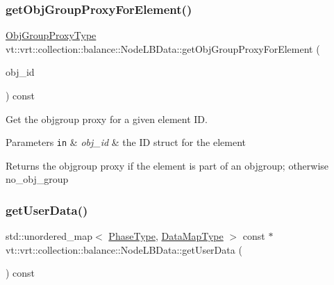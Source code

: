 \subsubsection{\texorpdfstring{get\+Obj\+Group\+Proxy\+For\+Element()}{getObjGroupProxyForElement()}}
{\footnotesize\ttfamily \hyperlink{namespacevt_ad7cae989df485fccca57f0792a880a8e}{Obj\+Group\+Proxy\+Type} vt\+::vrt\+::collection\+::balance\+::\+Node\+L\+B\+Data\+::get\+Obj\+Group\+Proxy\+For\+Element (\begin{DoxyParamCaption}\item[{\hyperlink{namespacevt_1_1vrt_1_1collection_1_1balance_a9f5b53fafb270212279a4757d2c4cd28}{Element\+I\+D\+Struct}}]{obj\+\_\+id }\end{DoxyParamCaption}) const}



Get the objgroup proxy for a given element ID. 


\begin{DoxyParams}[1]{Parameters}
\mbox{\tt in}  & {\em obj\+\_\+id} & the ID struct for the element\\
\hline
\end{DoxyParams}
\begin{DoxyReturn}{Returns}
the objgroup proxy if the element is part of an objgroup; otherwise {\ttfamily no\+\_\+obj\+\_\+group} 
\end{DoxyReturn}
\mbox{\label{structvt_1_1vrt_1_1collection_1_1balance_1_1_node_l_b_data_a73b93e4e239cc32982d5474fca1f7b64}} 
\subsubsection{\texorpdfstring{get\+User\+Data()}{getUserData()}}
{\footnotesize\ttfamily std\+::unordered\+\_\+map$<$ \hyperlink{namespacevt_a46ce6733d5cdbd735d561b7b4029f6d7}{Phase\+Type}, \hyperlink{namespacevt_1_1vrt_1_1collection_1_1balance_a5794b6bc763c88c78228074bd0d1a50f}{Data\+Map\+Type} $>$ const  $\ast$ vt\+::vrt\+::collection\+::balance\+::\+Node\+L\+B\+Data\+::get\+User\+Data (\begin{DoxyParamCaption}{ }\end{DoxyParamCaption}) const}



